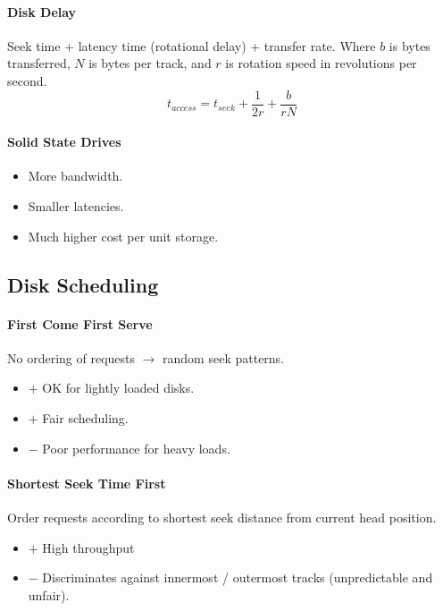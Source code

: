\documentclass[twocolumn,english]{article}
\begin{document}
\paragraph{Disk Delay}

Seek time + latency time (rotational delay) + transfer rate. Where
$b$ is bytes transferred, $N$ is bytes per track, and $r$ is rotation
speed in revolutions per second. 
\[
t_{access}=t_{seek}+\frac{1}{2r}+\frac{b}{rN}
\]



\paragraph{Solid State Drives}
\begin{itemize}
\item More bandwidth. 
\item Smaller latencies. 
\item Much higher cost per unit storage. 
\end{itemize}

\subsection{Disk Scheduling}


\paragraph{First Come First Serve}

No ordering of requests $\rightarrow$ random seek patterns. 
\begin{itemize}
\item $+$ OK for lightly loaded disks. 
\item $+$ Fair scheduling. 
\item $-$ Poor performance for heavy loads. 
\end{itemize}

\paragraph{Shortest Seek Time First}

Order requests according to shortest seek distance from current head
position. 
\begin{itemize}
\item $+$ High throughput
\item $-$ Discriminates against innermost / outermost tracks (unpredictable
and unfair). 
\end{itemize}
\end{document}
